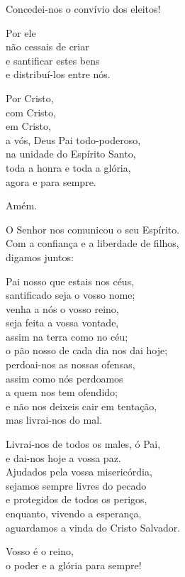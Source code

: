 \documentclass{book}
\begin{document}
\begin{flushleft}
    Concedei-nos o convívio dos eleitos!

    Por ele \\
    não cessais de criar \\
    e santificar estes bens \\
    e distribuí-los entre nós.

    Por Cristo, \\
    com Cristo, \\
    em Cristo, \\
    a vós, Deus Pai todo-poderoso, \\
    na unidade do Espírito Santo, \\
    toda a honra e toda a glória, \\
    agora e para sempre.

    Amém.

    O Senhor nos comunicou o seu Espírito. \\
    Com a confiança e a liberdade de filhos, \\
    digamos juntos:

    Pai nosso que estais nos céus, \\
    santificado seja o vosso nome; \\
    venha a nós o vosso reino, \\
    seja feita a vossa vontade, \\
    assim na terra como no céu; \\
    o pão nosso de cada dia nos dai hoje; \\
    perdoai-nos as nossas ofensas, \\
    assim como nós perdoamos \\
    a quem nos tem ofendido; \\
    e não nos deixeis cair em tentação, \\
    mas livrai-nos do mal.

    Livrai-nos de todos os males, ó Pai, \\
    e dai-nos hoje a vossa paz. \\
    Ajudados pela vossa misericórdia, \\
    sejamos sempre livres do pecado \\
    e protegidos de todos os perigos, \\
    enquanto, vivendo a esperança, \\
    aguardamos a vinda do Cristo Salvador.

    Vosso é o reino, \\
    o poder e a glória para sempre!


\end{flushleft}
\end{document}
